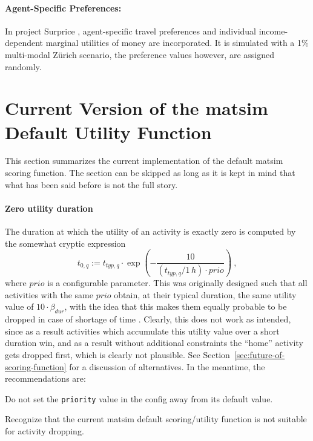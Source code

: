 \paragraph{Agent-Specific Preferences:}
In project Surprice \citet[][]{HorniEtAl_TechRep_IVT_2012_a, HorniAxhausen_TechRep_IVT_2014}, agent-specific travel preferences and individual income-dependent marginal utilities of money are incorporated. It is simulated with a 1\% multi-modal Zürich scenario, the preference values however, are assigned randomly. 

\section{Current Version of the \acrshort{matsim} Default Utility Function}
\label{sec:scoring-current}

This section summarizes the current implementation of the default \acrshort{matsim} scoring function.  The section can be skipped as long as it is kept in mind that what has been said before is not the full story.


\paragraph*{Zero utility duration}

The duration at which the utility of an activity is exactly zero is computed by the somewhat cryptic expression
\[
t_{0,q} := t_{typ,q} \cdot \exp\left( - \frac{10}{(t_{typ,q}/1\,h) \cdot prio} \right) \ ,
\]
where $prio$ is a configurable parameter.  This was originally designed such that all activities with the same $prio$ obtain, at their typical duration, the same utility value of $10 \cdot \beta_{dur}$, with the idea that this makes them equally probable to be dropped in case of shortage of time \cite{CharyparNagel2005ga4acts}.  Clearly, this does not work as intended, since as a result activities which accumulate this utility value over a short duration win, and as a result without additional constraints the ``home'' activity gets dropped first, which is clearly not plausible.  See Section~\ref{sec:future-of-scoring-function} for a discussion of alternatives.  In the meantime, the recommendations are:
\begin{compactitem}
\item Do not set the \verb$priority$ value in the config away from its default value.
\item Recognize that the current \acrshort{matsim} default scoring/utility function is not suitable for activity dropping.
\end{compactitem}


